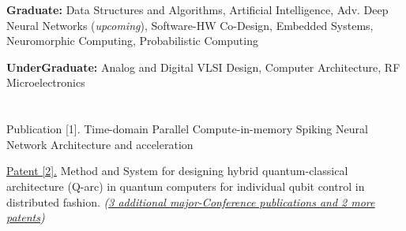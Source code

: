\documentclass[letterpaper,11pt]{article}
\newcommand{\resumeSubHeadingListEnd}{\end{itemize}}
\begin{document}

\begin{itemize}[leftmargin=0.15in, label={}]
\vspace{2pt}
    \small{\item{
     \textbf{\normalsize{Graduate:}}{ \normalsize{Data Structures and Algorithms, Artificial Intelligence, Adv. Deep Neural Networks (\textit{upcoming}), Software-HW Co-Design,  Embedded Systems, Neuromorphic Computing, Probabilistic Computing }} \\
    }}
    \vspace{1pt}
    \small{\item{
     \textbf{\normalsize{UnderGraduate:}}{ \normalsize{Analog and Digital VLSI Design, Computer Architecture, RF Microelectronics}} \\
    }}
    
 \end{itemize}
 \vspace{-15pt}



\section{\normalsize{}}

Publication [1]. {Time-domain Parallel Compute-in-memory Spiking Neural Network Architecture and acceleration }


\href{https://scholar.google.com/citations?user=uoffd9cAAAAJ&hl=en}{Patent [2].} Method and System for designing hybrid quantum-classical architecture (Q-arc) in quantum computers for individual qubit control in distributed fashion. \textit{(\underline{\href{https://scholar.google.com/citations?user=uoffd9cAAAAJ&hl=en}{3 additional major-Conference publications and 2 more patents}})} 
\end{document}
